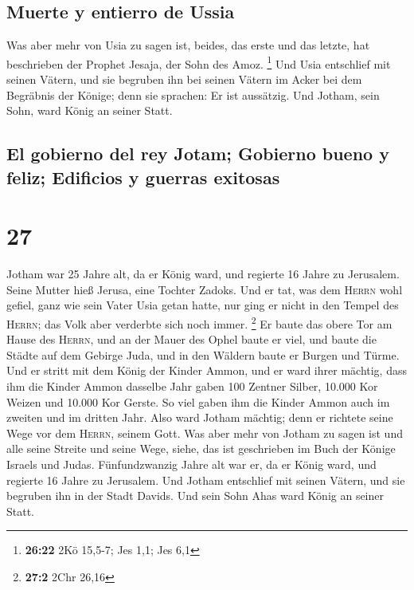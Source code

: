 \hypertarget{muerte-y-entierro-de-ussia}{%
\subsection{Muerte y entierro de
Ussia}\label{muerte-y-entierro-de-ussia}}

 Was aber mehr von Usia zu sagen ist, beides, das erste
und das letzte, hat beschrieben der Prophet Jesaja, der Sohn des Amoz.
\footnote{\textbf{26:22} 2Kö 15,5-7; Jes 1,1; Jes 6,1} 
Und Usia entschlief mit seinen Vätern, und sie begruben ihn bei seinen
Vätern im Acker bei dem Begräbnis der Könige; denn sie sprachen: Er ist
aussätzig. Und Jotham, sein Sohn, ward König an seiner Statt.

\hypertarget{el-gobierno-del-rey-jotam-gobierno-bueno-y-feliz-edificios-y-guerras-exitosas}{%
\subsection{El gobierno del rey Jotam; Gobierno bueno y feliz; Edificios
y guerras
exitosas}\label{el-gobierno-del-rey-jotam-gobierno-bueno-y-feliz-edificios-y-guerras-exitosas}}

\hypertarget{section-26}{%
\section{27}\label{section-26}}

 Jotham war 25 Jahre alt, da er König ward, und regierte
16 Jahre zu Jerusalem. Seine Mutter hieß Jerusa, eine Tochter Zadoks.
 Und er tat, was dem \textsc{Herrn} wohl gefiel, ganz wie
sein Vater Usia getan hatte, nur ging er nicht in den Tempel des
\textsc{Herrn}; das Volk aber verderbte sich noch immer. \footnote{\textbf{27:2}
  2Chr 26,16}  Er baute das obere Tor am Hause des
\textsc{Herrn}, und an der Mauer des Ophel baute er viel, 
und baute die Städte auf dem Gebirge Juda, und in den Wäldern baute er
Burgen und Türme.  Und er stritt mit dem König der Kinder
Ammon, und er ward ihrer mächtig, dass ihm die Kinder Ammon dasselbe
Jahr gaben 100 Zentner Silber, 10.000 Kor Weizen und 10.000 Kor Gerste.
So viel gaben ihm die Kinder Ammon auch im zweiten und im dritten Jahr.
 Also ward Jotham mächtig; denn er richtete seine Wege vor
dem \textsc{Herrn}, seinem Gott.  Was aber mehr von Jotham
zu sagen ist und alle seine Streite und seine Wege, siehe, das ist
geschrieben im Buch der Könige Israels und Judas. 
Fünfundzwanzig Jahre alt war er, da er König ward, und regierte 16 Jahre
zu Jerusalem.  Und Jotham entschlief mit seinen Vätern,
und sie begruben ihn in der Stadt Davids. Und sein Sohn Ahas ward König
an seiner Statt.

